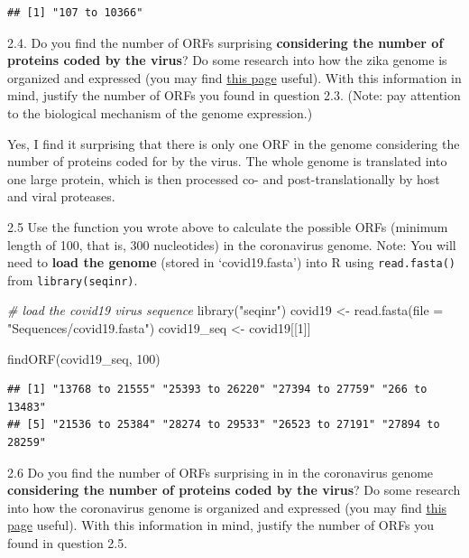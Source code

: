 \documentclass[
]{article}
\newenvironment{Shaded}{\begin{snugshade}}{\end{snugshade}}
\newcommand{\AttributeTok}[1]{\textcolor[rgb]{0.77,0.63,0.00}{#1}}
\newcommand{\CommentTok}[1]{\textcolor[rgb]{0.56,0.35,0.01}{\textit{#1}}}
\newcommand{\DecValTok}[1]{\textcolor[rgb]{0.00,0.00,0.81}{#1}}
\newcommand{\FunctionTok}[1]{\textcolor[rgb]{0.00,0.00,0.00}{#1}}
\newcommand{\NormalTok}[1]{#1}
\newcommand{\OtherTok}[1]{\textcolor[rgb]{0.56,0.35,0.01}{#1}}
\newcommand{\StringTok}[1]{\textcolor[rgb]{0.31,0.60,0.02}{#1}}
\begin{document}
\begin{verbatim}
## [1] "107 to 10366"
\end{verbatim}

2.4. Do you find the number of ORFs surprising \textbf{considering the
number of proteins coded by the virus}? Do some research into how the
zika genome is organized and expressed (you may find
\href{http://viralzone.expasy.org/6756?outline=all_by_species}{this
page} useful). With this information in mind, justify the number of ORFs
you found in question 2.3. (Note: pay attention to the biological
mechanism of the genome expression.) \span

{ Yes, I find it surprising that there is only one ORF in the genome
considering the number of proteins coded for by the virus. The whole
genome is translated into one large protein, which is then processed co-
and post-translationally by host and viral proteases. }

2.5 Use the function you wrote above to calculate the possible ORFs
(minimum length of 100, that is, 300 nucleotides) in the coronavirus
genome. Note: You will need to \textbf{load the genome} (stored in
`covid19.fasta') into R using \texttt{read.fasta()} from
\texttt{library(seqinr)}. \span

\begin{Shaded}
\begin{Highlighting}[]
\CommentTok{\# load the covid19 virus sequence}
\FunctionTok{library}\NormalTok{(}\StringTok{"seqinr"}\NormalTok{)}
\NormalTok{covid19 }\OtherTok{\textless{}{-}} \FunctionTok{read.fasta}\NormalTok{(}\AttributeTok{file =} \StringTok{"Sequences/covid19.fasta"}\NormalTok{)}
\NormalTok{covid19\_seq }\OtherTok{\textless{}{-}}\NormalTok{ covid19[[}\DecValTok{1}\NormalTok{]]}

\FunctionTok{findORF}\NormalTok{(covid19\_seq, }\DecValTok{100}\NormalTok{)}
\end{Highlighting}
\end{Shaded}

\begin{verbatim}
## [1] "13768 to 21555" "25393 to 26220" "27394 to 27759" "266 to 13483"  
## [5] "21536 to 25384" "28274 to 29533" "26523 to 27191" "27894 to 28259"
\end{verbatim}

2.6 Do you find the number of ORFs surprising in in the coronavirus
genome \textbf{considering the number of proteins coded by the virus}?
Do some research into how the coronavirus genome is organized and
expressed (you may find
\href{https://www-ncbi-nlm-nih-gov.proxy.uchicago.edu/pmc/articles/PMC7525243/}{this
page} useful). With this information in mind, justify the number of ORFs
you found in question 2.5. \span
\end{document}
